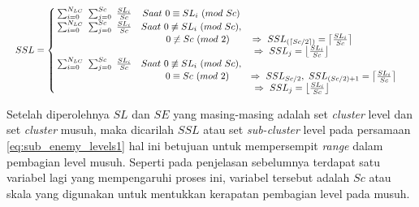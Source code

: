\begin{equation}\label{eq:sub_enemy_levels1}
\resizebox{\columnwidth}{!}{%
	$SSL = \left\{\begin{matrix}
	\hspace{0.2em} \sum_{i = 0}^{N_{LC}}\ \sum_{j = 0}^{Sc}\ \frac{SL_{i}}{Sc} & Saat\ 0 \equiv SL_{i}\ (mod\ Sc) & \\
	
	\hspace{0.2em} \sum_{i = 0}^{N_{LC}}\ \sum_{j = 0}^{Sc}\ \frac{SL_{i}}{Sc} & Saat\ 0 \not\equiv SL_{i}\ (mod\ Sc), & \\
	&\hspace{1.4em}  0 \not\equiv Sc\ (mod\ 2) & \hspace{-4.5em} \Rightarrow\ SSL_{(\left \lceil Sc/2 \right \rceil)}  = \left \lceil \frac{SL_{i}}{Sc} \right \rceil &\\
	
	& & \hspace{-6.8em} \Rightarrow\ SSL_{j}  = \left \lfloor \frac{SL_{i}}{Sc} \right \rfloor &\\
	
	\hspace{0.2em} \sum_{i = 0}^{N_{LC}}\ \sum_{j = 0}^{Sc}\ \frac{SL_{i}}{Sc} & Saat\ 0 \not\equiv SL_{i}\ (mod\ Sc), & \\
	&\hspace{1.3em}  0 \equiv Sc\ (mod\ 2) & \Rightarrow\ SSL_{Sc/2},\ SSL_{(Sc/2) + 1}  = \left \lceil \frac{SL_{i}}{Sc} \right \rceil &\\
	
	& & \hspace{-6.7em} \Rightarrow\ SSL_{j}  = \left \lfloor \frac{SL_{i}}{Sc} \right \rfloor &\\
	\end{matrix}\right.$%
}
\end{equation}

Setelah diperolehnya $SL$ dan $SE$ yang masing-masing adalah set \textit{cluster} level dan set \textit{cluster} musuh, maka dicarilah $SSL$ atau set \textit{sub-cluster} level pada persamaan \ref{eq:sub_enemy_levels1} hal ini betujuan untuk mempersempit \textit{range} dalam pembagian level musuh. Seperti pada penjelasan sebelumnya terdapat satu variabel lagi yang mempengaruhi proses ini, variabel tersebut adalah $Sc$ atau skala yang digunakan untuk mentukkan kerapatan pembagian level pada musuh. 
\vspace{1ex}

